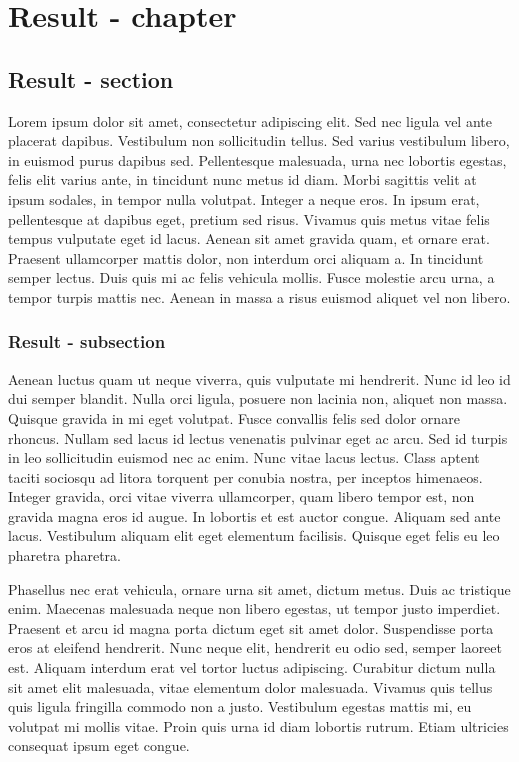\chapter{Result - chapter}
\section{Result - section}
Lorem ipsum dolor sit amet, consectetur adipiscing elit. Sed nec ligula vel
ante placerat dapibus. Vestibulum non sollicitudin tellus. Sed varius
vestibulum libero, in euismod purus dapibus sed. Pellentesque malesuada, urna
nec lobortis egestas, felis elit varius ante, in tincidunt nunc metus id diam.
Morbi sagittis velit at ipsum sodales, in tempor nulla volutpat. Integer a
neque eros. In ipsum erat, pellentesque at dapibus eget, pretium sed risus.
Vivamus quis metus vitae felis tempus vulputate eget id lacus. Aenean sit amet
gravida quam, et ornare erat. Praesent ullamcorper mattis dolor, non interdum
orci aliquam a. In tincidunt semper lectus. Duis quis mi ac felis vehicula
mollis. Fusce molestie arcu urna, a tempor turpis mattis nec. Aenean in massa a
risus euismod aliquet vel non libero.

\subsection{Result - subsection}
Aenean luctus quam ut neque viverra, quis vulputate mi hendrerit. Nunc id leo
id dui semper blandit. Nulla orci ligula, posuere non lacinia non, aliquet non
massa. Quisque gravida in mi eget volutpat. Fusce convallis felis sed dolor
ornare rhoncus. Nullam sed lacus id lectus venenatis pulvinar eget ac arcu. Sed
id turpis in leo sollicitudin euismod nec ac enim. Nunc vitae lacus lectus.
Class aptent taciti sociosqu ad litora torquent per conubia nostra, per
inceptos himenaeos. Integer gravida, orci vitae viverra ullamcorper, quam
libero tempor est, non gravida magna eros id augue. In lobortis et est auctor
congue. Aliquam sed ante lacus. Vestibulum aliquam elit eget elementum
facilisis. Quisque eget felis eu leo pharetra pharetra.

Phasellus nec erat vehicula, ornare urna sit amet, dictum metus. Duis ac
tristique enim. Maecenas malesuada neque non libero egestas, ut tempor justo
imperdiet. Praesent et arcu id magna porta dictum eget sit amet dolor.
Suspendisse porta eros at eleifend hendrerit. Nunc neque elit, hendrerit eu
odio sed, semper laoreet est. Aliquam interdum erat vel tortor luctus
adipiscing. Curabitur dictum nulla sit amet elit malesuada, vitae elementum
dolor malesuada. Vivamus quis tellus quis ligula fringilla commodo non a justo.
Vestibulum egestas mattis mi, eu volutpat mi mollis vitae. Proin quis urna id
diam lobortis rutrum. Etiam ultricies consequat ipsum eget congue.

